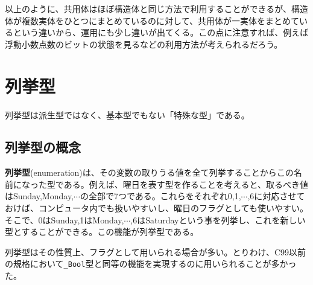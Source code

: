 以上のように、共用体はほぼ構造体と同じ方法で利用することができるが、構造体が複数実体をひとつにまとめているのに対して、共用体が一実体をまとめているという違いから、運用にも少し違いが出てくる。この点に注意すれば、例えば浮動小数点数のビットの状態を見るなどの利用方法が考えられるだろう。

\section{列挙型}
列挙型は派生型ではなく、基本型でもない「特殊な型」である。
\subsection{列挙型の概念}
\textbf{列挙型}(enumeration)は、その変数の取りうる値を全て列挙することからこの名前になった型である。例えば、曜日を表す型を作ることを考えると、取るべき値はSunday,Monday,$\cdots$の全部で7つである。これらをそれぞれ0,1,$\cdots$,6に対応させておけば、コンピュータ内でも扱いやすいし、曜日のフラグとしても使いやすい。そこで、0はSunday,1はMonday,$\cdots$,6はSaturdayという事を列挙し、これを新しい型とすることができる。この機能が列挙型である。

列挙型はその性質上、フラグとして用いられる場合が多い。とりわけ、C99以前の規格において\verb|_Bool|型と同等の機能を実現するのに用いられることが多かった。

